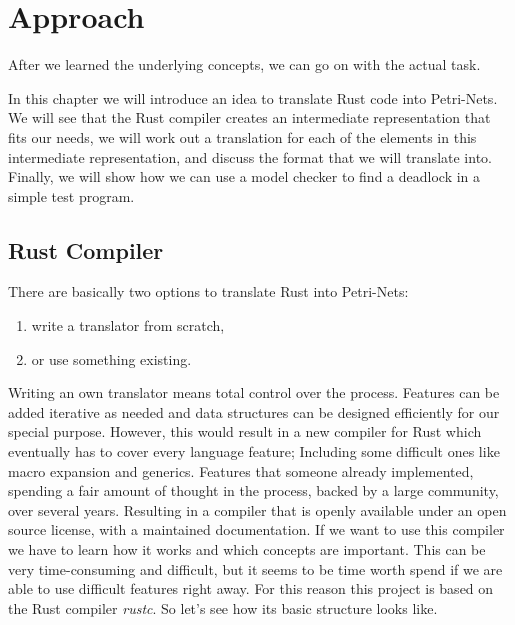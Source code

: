 \chapter{Approach}
\label{approach}
After we learned the underlying concepts, we can go on with the actual task.

In this chapter we will introduce an idea to translate Rust code into Petri-Nets.
We will see that the Rust compiler creates an intermediate representation that fits our needs,
we will work out a translation for each of the elements in this intermediate representation,
and discuss the format that we will translate into.
Finally, we will show how we can use a model checker to find a deadlock in a simple test program.

\section{Rust Compiler}
\label{app_rust}
There are basically two options to translate Rust into Petri-Nets:
\begin{enumerate}
    \item write a translator from scratch,
    \item or use something existing.
\end{enumerate}
Writing an own translator means total control over the process.
Features can be added iterative as needed and data structures can be designed efficiently for our special purpose.
However, this would result in a new compiler for Rust which eventually has to cover every language feature;
Including some difficult ones like macro expansion and generics.
Features that someone already implemented, spending a fair amount of thought in the process,
backed by a large community,
over several years.
Resulting in a compiler that is openly available under an open source license\cite{rustc}, with a maintained documentation\cite{rustc-guide}\cite{rustc-doc}.
If we want to use this compiler we have to learn how it works and which concepts are important.
This can be very time-consuming and difficult, but it seems to be time worth spend if we are able to use difficult features right away.
For this reason this project is based on the Rust compiler \textit{rustc}.
So let's see how its basic structure looks like.

